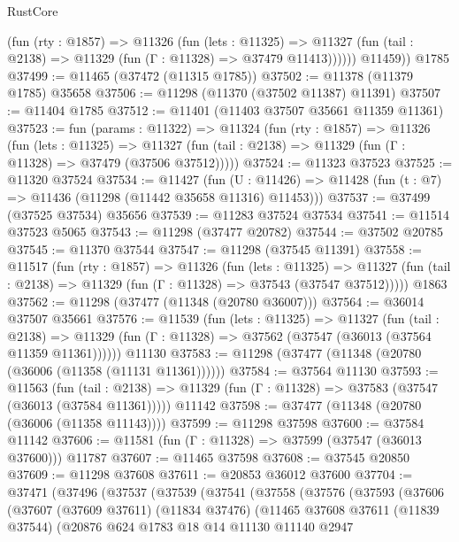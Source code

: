 \begin{lexlean}{RustCore}
\begin{coremodule}
            (fun (rty : @1857) =>
            @11326
              (fun (lets : @11325) =>
              @11327 (fun (tail : @2138) => @11329 (fun (Γ : @11328) => @37479 @11413))))))
        @11459))
    @1785
@37499 := @11465 (@37472 (@11315 @1785))
@37502 := @11378 (@11379 @1785) @35658
@37506 := @11298 (@11370 (@37502 @11387) @11391)
@37507 := @11404 @1785
@37512 := @11401 (@11403 @37507 @35661 @11359 @11361)
@37523 := fun (params : @11322) =>
  @11324
    (fun (rty : @1857) =>
    @11326
      (fun (lets : @11325) =>
      @11327 (fun (tail : @2138) => @11329 (fun (Γ : @11328) => @37479 (@37506 @37512)))))
@37524 := @11323 @37523
@37525 := @11320 @37524
@37534 := @11427
    (fun (U : @11426) => @11428 (fun (t : @7) => @11436 (@11298 (@11442 @35658 @11316) @11453)))
@37537 := @37499 (@37525 @37534) @35656
@37539 := @11283 @37524 @37534
@37541 := @11514 @37523 @5065
@37543 := @11298 (@37477 @20782)
@37544 := @37502 @20785
@37545 := @11370 @37544
@37547 := @11298 (@37545 @11391)
@37558 := @11517
    (fun (rty : @1857) =>
    @11326
      (fun (lets : @11325) =>
      @11327 (fun (tail : @2138) => @11329 (fun (Γ : @11328) => @37543 (@37547 @37512)))))
    @1863
@37562 := @11298 (@37477 (@11348 (@20780 @36007)))
@37564 := @36014 @37507 @35661
@37576 := @11539
    (fun (lets : @11325) =>
    @11327
      (fun (tail : @2138) =>
      @11329 (fun (Γ : @11328) => @37562 (@37547 (@36013 (@37564 @11359 @11361))))))
    @11130
@37583 := @11298 (@37477 (@11348 (@20780 (@36006 (@11358 (@11131 @11361))))))
@37584 := @37564 @11130
@37593 := @11563
    (fun (tail : @2138) => @11329 (fun (Γ : @11328) => @37583 (@37547 (@36013 (@37584 @11361)))))
    @11142
@37598 := @37477 (@11348 (@20780 (@36006 (@11358 @11143))))
@37599 := @11298 @37598
@37600 := @37584 @11142
@37606 := @11581 (fun (Γ : @11328) => @37599 (@37547 (@36013 @37600))) @11787
@37607 := @11465 @37598
@37608 := @37545 @20850
@37609 := @11298 @37608
@37611 := @20853 @36012 @37600
@37704 := @37471
    (@37496
      (@37537
        (@37539
          (@37541
            (@37558
              (@37576
                (@37593
                  (@37606
                    (@37607
                      (@37609 @37611)
                      (@11834 @37476)
                      (@11465
                        @37608
                        @37611
                        (@11839 @37544)
                        (@20876
                          @624
                          @1783
                          @18
                          @14
                          @11130
                          @11140
                          @2947

\end{coremodule}
\end{lexlean}

